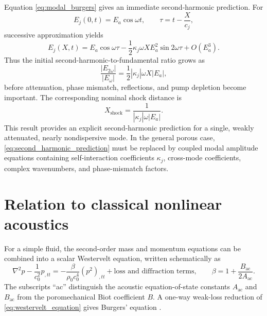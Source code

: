 \documentclass[11pt]{article}
\begin{document}
Equation \eqref{eq:modal_burgers} gives an immediate second-harmonic
prediction.  For
\begin{equation}
    E_j(0,t)=E_a\cos\omega t,
    \qquad
    \tau=t-\frac{X}{c_j},
    \label{eq:harmonic_boundary_data}
\end{equation}
successive approximation yields
\begin{equation}
    E_j(X,t)
    =E_a\cos\omega\tau
    -\frac{1}{2}\kappa_j\omega X E_a^2
    \sin 2\omega\tau
    +O\left(E_a^3\right).
    \label{eq:second_harmonic_prediction}
\end{equation}
Thus the initial second-harmonic-to-fundamental ratio grows as
\begin{equation}
    \frac{|E_{2\omega}|}{|E_\omega|}
    =\frac{1}{2}|\kappa_j|\omega X|E_a|,
    \label{eq:second_harmonic_ratio}
\end{equation}
before attenuation, phase mismatch, reflections, and pump depletion become
important.  The corresponding nominal shock distance is
\begin{equation}
    X_{\mathrm{shock}}
    =\frac{1}{|\kappa_j|\omega|E_a|}.
    \label{eq:shock_distance}
\end{equation}
This result provides an explicit second-harmonic prediction for a single,
weakly attenuated, nearly nondispersive mode.  In the general porous case,
\eqref{eq:second_harmonic_prediction} must be replaced by coupled modal
amplitude equations containing self-interaction coefficients
\(\kappa_j\), cross-mode coefficients, complex wavenumbers, and phase-mismatch
factors.

\section{Relation to classical nonlinear acoustics}

For a simple fluid, the second-order mass and momentum equations can be
combined into a scalar Westervelt equation, written schematically as
\begin{equation}
    \nabla^2p-\frac{1}{c_0^2}p_{,tt}
    =-\frac{\beta}{\rho_0c_0^4}
    \left(p^2\right)_{,tt}
    +\text{loss and diffraction terms},
    \qquad
    \beta=1+\frac{B_{\mathrm{ac}}}{2A_{\mathrm{ac}}}.
    \label{eq:westervelt_equation}
\end{equation}
The subscripts ``ac'' distinguish the acoustic equation-of-state constants
\(A_{\mathrm{ac}}\) and \(B_{\mathrm{ac}}\) from the poromechanical Biot
coefficient \(B\).  A one-way weak-loss reduction of
\eqref{eq:westervelt_equation} gives Burgers' equation
\cite{hamiltonblackstock}.
\end{document}

